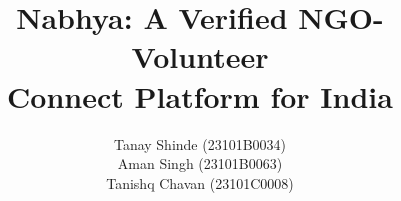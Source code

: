 \newcommand{\seqfigure}[5]{%
  \begin{figure}[H]\centering
  \imgph{\textwidth}{#5}{#1.png}
  \caption{#3}\label{#4}
  \end{figure}}


\setlength{\headheight}{14pt}
\pagestyle{fancy}
\fancyhf{}
\renewcommand{\headrulewidth}{0pt}

\cleardoublepage
{}

\title{\LARGE Nabhya: A Verified NGO-Volunteer\\Connect Platform for India}
\author{Tanay Shinde (23101B0034)\\[0.05in]
        Aman Singh (23101B0063)\\[0.05in]
        Tanishq Chavan (23101C0008)}
\date{}
\maketitle

